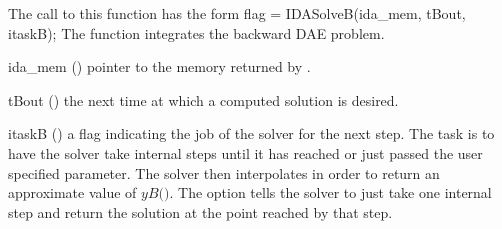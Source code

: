 The call to this function has the form
{
  flag = IDASolveB(ida\_mem, tBout, itaskB);
}
{
  The function  integrates the backward DAE problem.
}
{
  \begin{args}
  \item[ida\_mem] ()
    pointer to the {\idas} memory returned by .
  \item[tBout] ()
    the next time at which a computed solution is desired.
  \item[itaskB] ()
    a flag indicating the job of the solver for the next step. 
    The  task is to have the solver take internal steps until   
    it has reached or just passed the user specified 
    parameter. The solver then interpolates in order to   
    return an approximate value of $yB($$)$. 
    The  option tells the solver to just take one internal step  
    and return the solution at the point reached by that step. 
  \end{args}
}
